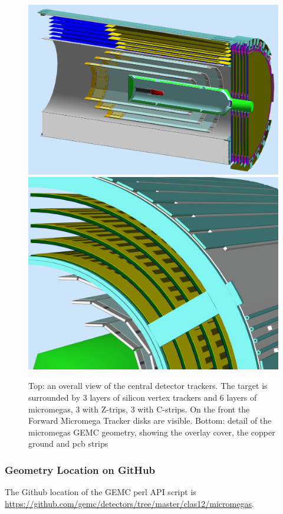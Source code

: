 \begin{figure}
	\centering
	\includegraphics[width=0.95\columnwidth,keepaspectratio]{img/bmtGeometry.png}
	\includegraphics[width=0.95\columnwidth,keepaspectratio]{img/bmtDetail.png}
	\caption{Top: an overall view of the central detector trackers. The target is surrounded by 3 layers of silicon vertex trackers and
            6 layers of micromegas, 3 with Z-trips, 3 with C-strips. On the front the Forward Micromega Tracker disks are visible.
            Bottom: detail of the micromegas GEMC geometry, showing the overlay cover, the copper ground and pcb strips}
	\label{fig:bmtGeometry}
\end{figure}



\subsubsection{Geometry Location on GitHub}
The Github location of the GEMC perl API script is \url{https://github.com/gemc/detectors/tree/master/clas12/micromegas}.


